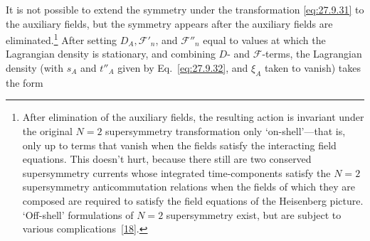 It is not possible to extend the symmetry under the transformation
\eqref{eq:27.9.31} to the auxiliary fields, but the symmetry appears after
the auxiliary fields are eliminated.\footnote{After elimination of the
auxiliary fields, the resulting action is invariant under the original
\(N=2\) supersymmetry transformation only `on-shell'---that is, only up to
terms that vanish when the fields satisfy the interacting field equations.
This doesn't hurt, because there still are two conserved supersymmetry
currents whose integrated time-components satisfy the \(N=2\) supersymmetry
anticommutation relations when the fields of which they are composed are
required to satisfy the field equations of the Heisenberg picture. `Off-shell'
formulations of \(N=2\) supersymmetry exist, but are subject to various
complications~\hyperref[ch27-ref-18]{[18]}.} After setting
\(D_A,\mathcal{F}'_n\), and \(\mathcal{F}''_n\) equal to values at which the
Lagrangian density is stationary, and combining \(D\)- and
\(\mathcal{F}\)-terms, the Lagrangian density (with \(s_A\) and \(t''_A\)
given by Eq.~\eqref{eq:27.9.32}, and \(\xi_A\) taken to vanish) takes the form
